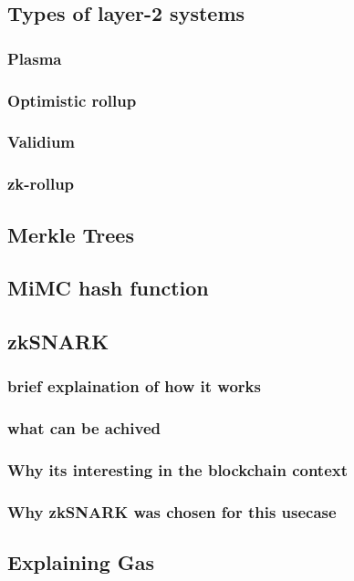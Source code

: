 \documentclass[../../thesis.tex]{subfiles}
\begin{document}
\subsection{Types of layer-2 systems}

\subsubsection{Plasma}
\subsubsection{Optimistic rollup}
\subsubsection{Validium}
\subsubsection{zk-rollup}

\subsection{Merkle Trees}

\subsection{MiMC hash function}

\subsection{zkSNARK}
\subsubsection{brief explaination of how it works}
\subsubsection{what can be achived}
\subsubsection{Why its interesting in the blockchain context}
\subsubsection{Why zkSNARK was chosen for this usecase}

\subsection{Explaining Gas}
\end{document}
